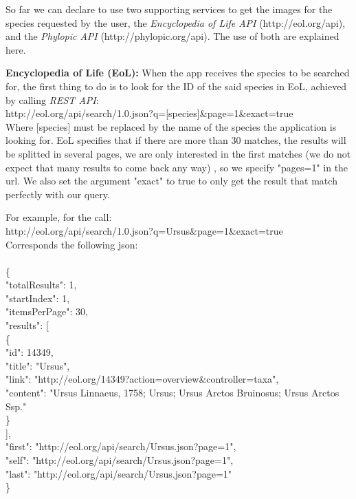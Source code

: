 \documentclass[10pt]{article}
\begin{document}
So far we can declare to use two supporting services to get the images for the species requested by the user, the \textit{Encyclopedia of Life API} (http://eol.org/api), and the \textit{Phylopic API} (http://phylopic.org/api). The use of both are explained here.

\textbf{Encyclopedia of Life (EoL):} When the app receives the species to be searched for, the first thing to do is to look for the ID of the said species in EoL, achieved by calling \textit{REST API}:\\

http://eol.org/api/search/1.0.json?q=[species]\&page=1\&exact=true\\

Where [species] must be replaced by the name of the species the application is looking for. EoL specifies that if there are more than 30 matches, the results will be splitted in several pages, we are only interested in the first matches (we do not expect that many results to come back any way) , so we specify "pages=1" in the url. We also set the argument "exact" to true to only get the result that match perfectly with our query.

For example, for the call:\\

http://eol.org/api/search/1.0.json?q=Ursus\&page=1\&exact=true\\

Corresponds the following json:\\\\
\{\\
  "totalResults": 1,\\
  "startIndex": 1,\\
  "itemsPerPage": 30,\\
  "results": [\\
    \{\\
      "id": 14349,\\
      "title": "Ursus",\\
      "link": "http://eol.org/14349?action=overview\&controller=taxa",\\
      "content": "Ursus Linnaeus, 1758; Ursus; Ursus Arctos Bruinosus; Ursus Arctos Ssp."\\
    \}\\
  ],\\
  "first": "http://eol.org/api/search/Ursus.json?page=1",\\
  "self": "http://eol.org/api/search/Ursus.json?page=1",\\
  "last": "http://eol.org/api/search/Ursus.json?page=1"\\
\}\\
 
\end{document}
